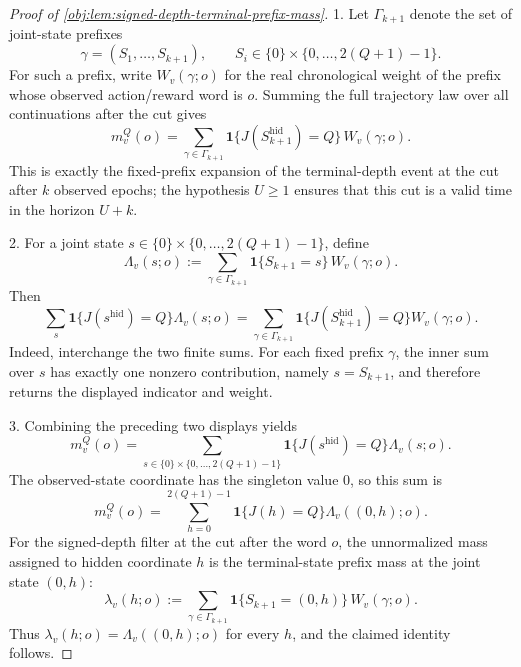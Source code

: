 \documentclass[11pt]{article}
\begin{document}
\begin{proof}[Proof of \cref{obj:lem:signed-depth-terminal-prefix-mass}]
1.  Let \(\Gamma_{k+1}\) denote the set of joint-state prefixes
\[
\gamma=(S_1,\ldots,S_{k+1}),
\qquad
S_i\in \{0\}\times\{0,\ldots,2(Q+1)-1\}.
\]
For such a prefix, write \(W_v(\gamma;o)\) for the real chronological weight of the prefix whose observed action/reward word is \(o\). Summing the full trajectory law over all continuations after the cut gives
\[
m_v^Q(o)
=
\sum_{\gamma\in\Gamma_{k+1}}
\mathbf 1\{J(S_{k+1}^{\mathrm{hid}})=Q\}\,
W_v(\gamma;o).
\]
This is exactly the fixed-prefix expansion of the terminal-depth event at the cut after \(k\) observed epochs; the hypothesis \(U\ge 1\) ensures that this cut is a valid time in the horizon \(U+k\). %

2.  For a joint state \(s\in \{0\}\times\{0,\ldots,2(Q+1)-1\}\), define
\[
\Lambda_v(s;o)
:=
\sum_{\gamma\in\Gamma_{k+1}}
\mathbf 1\{S_{k+1}=s\}\,W_v(\gamma;o).
\]
Then
\[
\sum_{s}
\mathbf 1\{J(s^{\mathrm{hid}})=Q\}\Lambda_v(s;o)
=
\sum_{\gamma\in\Gamma_{k+1}}
\mathbf 1\{J(S_{k+1}^{\mathrm{hid}})=Q\}W_v(\gamma;o).
\]
Indeed, interchange the two finite sums. For each fixed prefix \(\gamma\), the inner sum over \(s\) has exactly one nonzero contribution, namely \(s=S_{k+1}\), and therefore returns the displayed indicator and weight. %

3.  Combining the preceding two displays yields
\[
m_v^Q(o)
=
\sum_{s\in \{0\}\times\{0,\ldots,2(Q+1)-1\}}
\mathbf 1\{J(s^{\mathrm{hid}})=Q\}\Lambda_v(s;o).
\]
The observed-state coordinate has the singleton value \(0\), so this sum is
\[
m_v^Q(o)
=
\sum_{h=0}^{2(Q+1)-1}
\mathbf 1\{J(h)=Q\}\Lambda_v((0,h);o).
\]
For the signed-depth filter at the cut after the word \(o\), the unnormalized mass assigned to hidden coordinate \(h\) is the terminal-state prefix mass at the joint state \((0,h)\):
\[
\lambda_v(h;o)
:=
\sum_{\gamma\in\Gamma_{k+1}}
\mathbf 1\{S_{k+1}=(0,h)\}\,W_v(\gamma;o).
\]
Thus \(\lambda_v(h;o)=\Lambda_v((0,h);o)\) for every \(h\), and the claimed identity follows. %
\end{proof}
\end{document}
